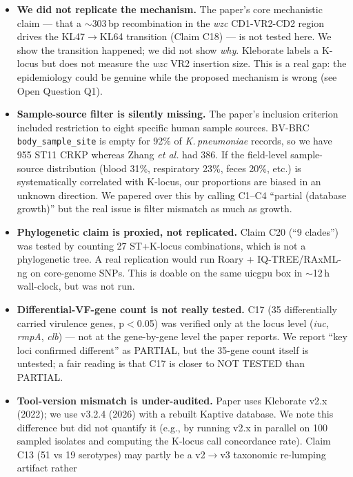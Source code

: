 \documentclass[11pt]{article}
\begin{document}
\begin{itemize}[leftmargin=*, itemsep=2pt]
  \item \textbf{We did not replicate the mechanism.} The paper's core mechanistic claim ---
    that a $\sim 303\,$bp recombination in the \emph{wzc} CD1-VR2-CD2 region drives the
    KL47$\rightarrow$KL64 transition (Claim C18) --- is not tested here. We show the
    transition happened; we did not show \emph{why}. Kleborate labels a K-locus but does
    not measure the \emph{wzc} VR2 insertion size. This is a real gap: the epidemiology
    could be genuine while the proposed mechanism is wrong (see Open Question Q1).
  \item \textbf{Sample-source filter is silently missing.} The paper's inclusion criterion
    included restriction to eight specific human sample sources. BV-BRC \texttt{body\_sample\_site}
    is empty for 92\% of \emph{K.\,pneumoniae} records, so we have 955 ST11 CRKP whereas
    Zhang \emph{et al.} had 386. If the field-level sample-source distribution (blood 31\%,
    respiratory 23\%, feces 20\%, etc.) is systematically correlated with K-locus, our
    proportions are biased in an unknown direction. We papered over this by calling C1--C4
    ``partial (database growth)'' but the real issue is filter mismatch as much as growth.
  \item \textbf{Phylogenetic claim is proxied, not replicated.} Claim C20 (``9 clades'')
    was tested by counting 27 ST+K-locus combinations, which is not a phylogenetic tree.
    A real replication would run Roary + IQ-TREE/RAxML-ng on core-genome SNPs. This is
    doable on the same uicgpu box in $\sim$12\,h wall-clock, but was not run.
  \item \textbf{Differential-VF-gene count is not really tested.} C17 (35 differentially
    carried virulence genes, p$<$0.05) was verified only at the locus level (\emph{iuc},
    \emph{rmpA}, \emph{clb}) — not at the gene-by-gene level the paper reports. We report
    ``key loci confirmed different'' as PARTIAL, but the 35-gene count itself is
    untested; a fair reading is that C17 is closer to NOT TESTED than PARTIAL.
  \item \textbf{Tool-version mismatch is under-audited.} Paper uses Kleborate v2.x
    (2022); we use v3.2.4 (2026) with a rebuilt Kaptive database. We note this
    difference but did not quantify it (e.g., by running v2.x in parallel on 100 sampled
    isolates and computing the K-locus call concordance rate). Claim C13 (51 vs 19
    serotypes) may partly be a v2$\rightarrow$v3 taxonomic re-lumping artifact rather

\end{itemize}
\end{document}
